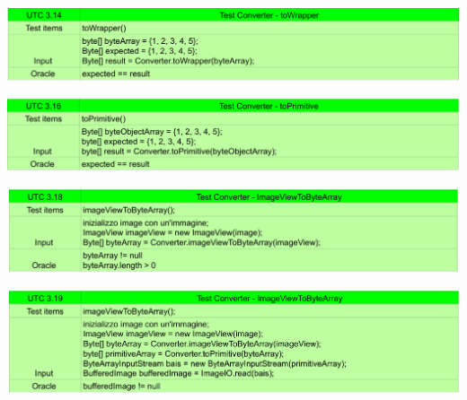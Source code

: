 \begin{center} \includegraphics[width=\linewidth]{images/UTC/3.14.png} \end{center}
\begin{center} \includegraphics[width=\linewidth]{images/UTC/3.16.png} \end{center}
\begin{center} \includegraphics[width=\linewidth]{images/UTC/3.18.png} \end{center}
\begin{center} \includegraphics[width=\linewidth]{images/UTC/3.19.png} \end{center}
